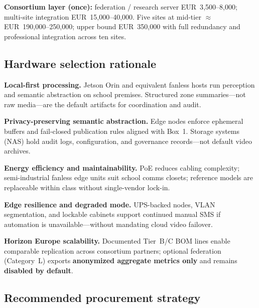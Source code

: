 \noindent\textbf{Consortium layer (once):} federation / research server EUR~3{,}500--8{,}000;
multi-site integration EUR~15{,}000--40{,}000.
Five sites at mid-tier $\approx$ EUR~190{,}000--250{,}000; upper bound EUR~350{,}000 with full
redundancy and professional integration across ten sites.

\subsection{Hardware selection rationale}

\textbf{Local-first processing.}
Jetson Orin and equivalent fanless hosts run perception and semantic abstraction on school premises.
Structured zone summaries---not raw media---are the default artifacts for coordination and audit.

\textbf{Privacy-preserving semantic abstraction.}
Edge nodes enforce ephemeral buffers and fail-closed publication rules aligned with Box~1.
Storage systems (NAS) hold audit logs, configuration, and governance records---not default video archives.

\textbf{Energy efficiency and maintainability.}
PoE reduces cabling complexity; semi-industrial fanless edge units suit school comms closets;
reference models are replaceable within class without single-vendor lock-in.

\textbf{Edge resilience and degraded mode.}
UPS-backed nodes, VLAN segmentation, and lockable cabinets support continued manual SMS if automation
is unavailable---without mandating cloud video failover.

\textbf{Horizon Europe scalability.}
Documented Tier~B/C BOM lines enable comparable replication across consortium partners;
optional federation (Category~L) exports \textbf{anonymized aggregate metrics only} and remains
\textbf{disabled by default}.

\subsection{Recommended procurement strategy}

